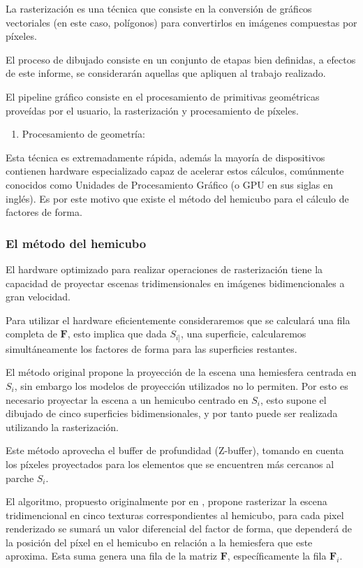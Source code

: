 La rasterización es una técnica que consiste en la conversión de gráficos vectoriales (en este caso, polígonos) para convertirlos en imágenes compuestas por píxeles.

El proceso de dibujado consiste en un conjunto de etapas bien definidas, a efectos de este informe, se considerarán aquellas que apliquen al trabajo realizado.

El pipeline gráfico consiste en el procesamiento de primitivas geométricas proveídas por el usuario, la rasterización y procesamiento de píxeles.

\begin{enumerate}
	\item Procesamiento de geometría: 
\end{enumerate}


Esta técnica es extremadamente rápida, además la mayoría de dispositivos contienen hardware especializado capaz de acelerar estos cálculos, comúnmente conocidos como Unidades de Procesamiento Gráfico (o GPU en sus siglas en inglés). Es por este motivo que existe el método del hemicubo para el cálculo de factores de forma.

\subsubsection{El método del hemicubo}

El hardware optimizado para realizar operaciones de rasterización tiene la capacidad de proyectar escenas tridimensionales en imágenes bidimencionales a gran velocidad.

Para utilizar el hardware eficientemente consideraremos que se calculará una fila completa de $\mathbf{F}$, esto implica que dada $S_{i]}$, una superficie, calcularemos simultáneamente los factores de forma para las superficies restantes. 

El método original propone la proyección de la escena una hemiesfera centrada en $S_{i}$, sin embargo los modelos de proyección utilizados no lo permiten. Por esto es necesario proyectar la escena a un hemicubo centrado en $S_{i}$, esto supone el dibujado de cinco superficies bidimensionales, y por tanto puede ser realizada utilizando la rasterización.

Este método aprovecha el buffer de profundidad (Z-buffer), tomando en cuenta los píxeles proyectados para los elementos que se encuentren más cercanos al parche $S_{i}$.

El algoritmo, propuesto originalmente por \citeauthor{Cohen} en \citeyear{Cohen}, propone rasterizar la escena tridimencional en cinco texturas correspondientes al hemicubo, para cada pixel renderizado se sumará un valor diferencial del factor de forma, que dependerá de la posición del píxel en el hemicubo en relación a la hemiesfera que este aproxima. Esta suma genera una fila de la matriz $\mathbf{F}$, específicamente la fila $\mathbf{F}_{i}$.

